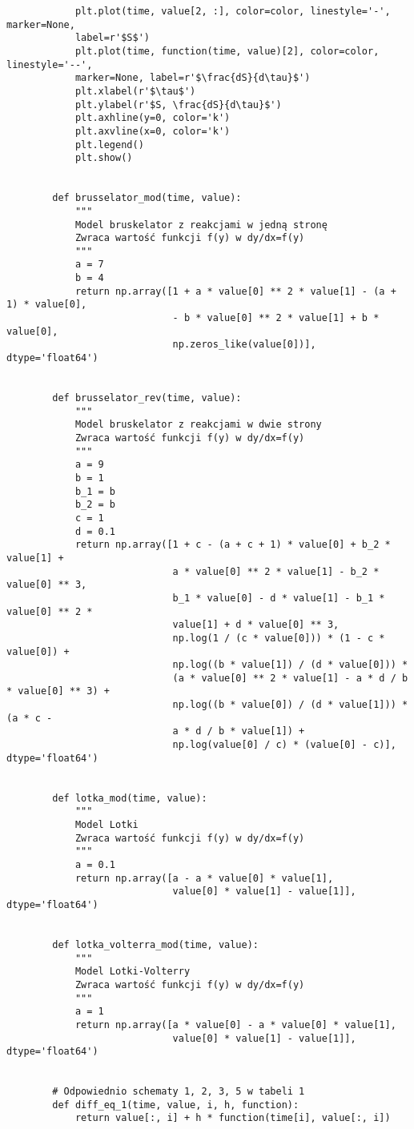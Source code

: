 \documentclass[10pt, a4paper, twoside, onecolumn]{article}
\numberwithin{equation}{section}
\begin{document}
\begin{verbatim}
		    plt.plot(time, value[2, :], color=color, linestyle='-', marker=None, 
		    label=r'$S$')
		    plt.plot(time, function(time, value)[2], color=color, linestyle='--', 
		    marker=None, label=r'$\frac{dS}{d\tau}$')
		    plt.xlabel(r'$\tau$')
		    plt.ylabel(r'$S, \frac{dS}{d\tau}$')
		    plt.axhline(y=0, color='k')
		    plt.axvline(x=0, color='k')
		    plt.legend()
		    plt.show()


		def brusselator_mod(time, value):
			"""
			Model bruskelator z reakcjami w jedną stronę
			Zwraca wartość funkcji f(y) w dy/dx=f(y)
			"""
		    a = 7
		    b = 4
		    return np.array([1 + a * value[0] ** 2 * value[1] - (a + 1) * value[0],
		                     - b * value[0] ** 2 * value[1] + b * value[0],
		                     np.zeros_like(value[0])], dtype='float64')


		def brusselator_rev(time, value):
			"""
			Model bruskelator z reakcjami w dwie strony
			Zwraca wartość funkcji f(y) w dy/dx=f(y)
			"""
		    a = 9
		    b = 1
		    b_1 = b
		    b_2 = b
		    c = 1
		    d = 0.1
		    return np.array([1 + c - (a + c + 1) * value[0] + b_2 * value[1] + 
		                     a * value[0] ** 2 * value[1] - b_2 * value[0] ** 3,
		                     b_1 * value[0] - d * value[1] - b_1 * value[0] ** 2 * 
		                     value[1] + d * value[0] ** 3,
		                     np.log(1 / (c * value[0])) * (1 - c * value[0]) +
		                     np.log((b * value[1]) / (d * value[0])) * 
		                     (a * value[0] ** 2 * value[1] - a * d / b * value[0] ** 3) +
		                     np.log((b * value[0]) / (d * value[1])) * (a * c - 
		                     a * d / b * value[1]) +
		                     np.log(value[0] / c) * (value[0] - c)], dtype='float64')


		def lotka_mod(time, value):
			"""
			Model Lotki
			Zwraca wartość funkcji f(y) w dy/dx=f(y)
			"""
		    a = 0.1
		    return np.array([a - a * value[0] * value[1],
		                     value[0] * value[1] - value[1]], dtype='float64')


		def lotka_volterra_mod(time, value):
			"""
			Model Lotki-Volterry
			Zwraca wartość funkcji f(y) w dy/dx=f(y)
			"""
		    a = 1
		    return np.array([a * value[0] - a * value[0] * value[1],
		                     value[0] * value[1] - value[1]], dtype='float64')


		# Odpowiednio schematy 1, 2, 3, 5 w tabeli 1
		def diff_eq_1(time, value, i, h, function):
		    return value[:, i] + h * function(time[i], value[:, i])
		

\end{verbatim}
\end{document}

